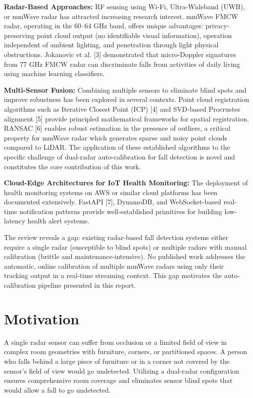 \textbf{Radar-Based Approaches:} RF sensing using Wi-Fi, Ultra-Wideband (UWB), or mmWave radar has attracted increasing research interest. mmWave FMCW radar, operating in the 60--64 GHz band, offers unique advantages: privacy-preserving point cloud output (no identifiable visual information), operation independent of ambient lighting, and penetration through light physical obstructions. Jokanovic et al. [3] demonstrated that micro-Doppler signatures from 77 GHz FMCW radar can discriminate falls from activities of daily living using machine learning classifiers. 

\textbf{Multi-Sensor Fusion:} Combining multiple sensors to eliminate blind spots and improve robustness has been explored in several contexts. Point cloud registration algorithms such as Iterative Closest Point (ICP) [4] and SVD-based Procrustes alignment [5] provide principled mathematical frameworks for spatial registration. RANSAC [6] enables robust estimation in the presence of outliers, a critical property for mmWave radar which generates sparse and noisy point clouds compared to LiDAR. The application of these established algorithms to the specific challenge of dual-radar auto-calibration for fall detection is novel and constitutes the core contribution of this work. 

\textbf{Cloud-Edge Architectures for IoT Health Monitoring:} The deployment of health monitoring systems on AWS or similar cloud platforms has been documented extensively. FastAPI [7], DynamoDB, and WebSocket-based real-time notification patterns provide well-established primitives for building low-latency health alert systems. 

The review reveals a gap: existing radar-based fall detection systems either require a single radar (susceptible to blind spots) or multiple radars with manual calibration (brittle and maintenance-intensive). No published work addresses the automatic, online calibration of multiple mmWave radars using only their tracking output in a real-time streaming context. This gap motivates the auto-calibration pipeline presented in this report. 


\section{Motivation}

A single radar sensor can suffer from occlusion or a limited field of view in complex room geometries with furniture, corners, or partitioned spaces. A person who falls behind a large piece of furniture or in a corner not covered by the sensor's field of view would go undetected. Utilizing a dual-radar configuration ensures comprehensive room coverage and eliminates sensor blind spots that would allow a fall to go undetected. 

